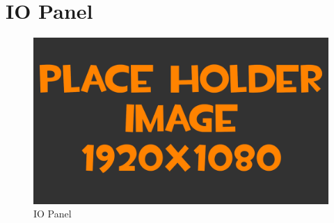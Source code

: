 
\section{IO Panel}
\begin{figure}[h!]
	\centering
	\includegraphics[width=\textwidth]{pictures/placeHolderFHD.png}
    	\caption{IO Panel}
   	\label{fig:panelIO}
\end{figure}

\newpage





%
%
